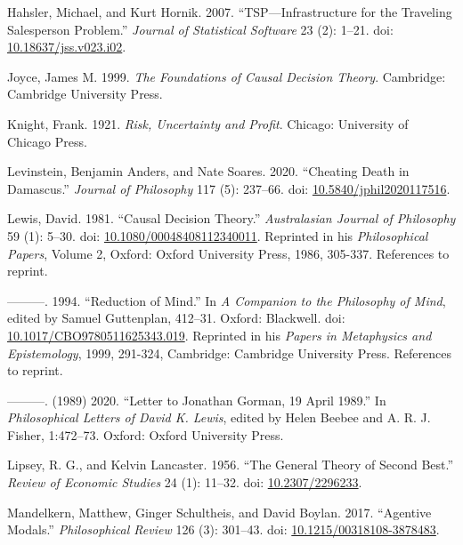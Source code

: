 \documentclass[
  10pt,
  letterpaper,
  DIV=11,
  numbers=noendperiod,
  twoside]{scrartcl}
\newlength{\cslhangindent}
\newenvironment{CSLReferences}[2] %
 {\begin{list}{}{%
  \setlength{\itemindent}{0pt}
  \setlength{\leftmargin}{0pt}
  \setlength{\parsep}{0pt}
  \ifodd #1
   \setlength{\leftmargin}{\cslhangindent}
   \setlength{\itemindent}{-1\cslhangindent}
  \fi
  \setlength{\itemsep}{#2\baselineskip}}}
 {\end{list}}
\begin{document}
\begin{CSLReferences}{1}{0}
Hahsler, Michael, and Kurt Hornik. 2007. {``TSP---Infrastructure for the
Traveling Salesperson Problem.''} \emph{Journal of Statistical Software}
23 (2): 1--21. doi:
\href{https://doi.org/10.18637/jss.v023.i02}{10.18637/jss.v023.i02}.

Joyce, James M. 1999. \emph{The Foundations of Causal Decision Theory}.
Cambridge: Cambridge University Press.

Knight, Frank. 1921. \emph{Risk, Uncertainty and Profit}. Chicago:
University of Chicago Press.

Levinstein, Benjamin Anders, and Nate Soares. 2020. {``Cheating Death in
Damascus.''} \emph{Journal of Philosophy} 117 (5): 237--66. doi:
\href{https://doi.org/10.5840/jphil2020117516}{10.5840/jphil2020117516}.

Lewis, David. 1981. {``Causal Decision Theory.''} \emph{Australasian
Journal of Philosophy} 59 (1): 5--30. doi:
\href{https://doi.org/10.1080/00048408112340011}{10.1080/00048408112340011}.
Reprinted in his \emph{Philosophical Papers}, Volume 2, Oxford: Oxford
University Press, 1986, 305-337. References to reprint.

---------. 1994. {``Reduction of Mind.''} In \emph{A Companion to the
Philosophy of Mind}, edited by Samuel Guttenplan, 412--31. Oxford:
Blackwell. doi:
\href{https://doi.org/10.1017/CBO9780511625343.019}{10.1017/CBO9780511625343.019}.
Reprinted in his \emph{Papers in Metaphysics and Epistemology}, 1999,
291-324, Cambridge: Cambridge University Press. References to reprint.

---------. (1989) 2020. {``Letter to Jonathan Gorman, 19 April 1989.''}
In \emph{Philosophical Letters of David {K}. Lewis}, edited by Helen
Beebee and A. R. J. Fisher, 1:472--73. Oxford: Oxford University Press.

Lipsey, R. G., and Kelvin Lancaster. 1956. {``The General Theory of
Second Best.''} \emph{Review of Economic Studies} 24 (1): 11--32. doi:
\href{https://doi.org/10.2307/2296233}{10.2307/2296233}.

Mandelkern, Matthew, Ginger Schultheis, and David Boylan. 2017.
{``Agentive Modals.''} \emph{Philosophical Review} 126 (3): 301--43.
doi:
\href{https://doi.org/10.1215/00318108-3878483}{10.1215/00318108-3878483}.


\end{CSLReferences}
\end{document}
